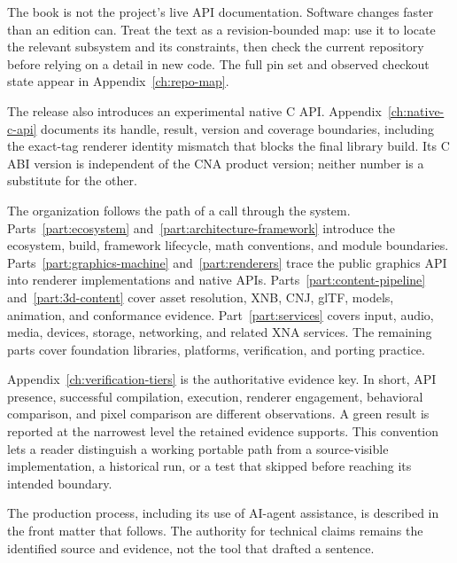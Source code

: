 The book is not the project's live API documentation. Software changes faster than an edition
can. Treat the text as a revision-bounded map: use it to locate the relevant subsystem and its
constraints, then check the current repository before relying on a detail in new code. The full
pin set and observed checkout state appear in Appendix~\ref{ch:repo-map}.

The release also introduces an experimental native C API. Appendix~\ref{ch:native-c-api}
documents its handle, result, version and coverage boundaries, including the exact-tag renderer
identity mismatch that blocks the final library build. Its C ABI version is independent of the
CNA product version; neither number is a substitute for the other.

The organization follows the path of a call through the system. Parts~\ref{part:ecosystem}
and~\ref{part:architecture-framework} introduce the ecosystem, build, framework lifecycle,
math conventions, and module boundaries. Parts~\ref{part:graphics-machine}
and~\ref{part:renderers} trace the public graphics API into renderer implementations and native
APIs. Parts~\ref{part:content-pipeline} and~\ref{part:3d-content} cover asset resolution, XNB,
CNJ, glTF, models, animation, and conformance evidence. Part~\ref{part:services} covers input,
audio, media, devices, storage, networking, and related XNA services. The remaining parts cover
foundation libraries, platforms, verification, and porting practice.

Appendix~\ref{ch:verification-tiers} is the authoritative evidence key. In short, API presence,
successful compilation, execution, renderer engagement, behavioral comparison, and pixel
comparison are different observations. A green result is reported at the narrowest level the
retained evidence supports. This convention lets a reader distinguish a working portable path
from a source-visible implementation, a historical run, or a test that skipped before reaching
its intended boundary.

The production process, including its use of AI-agent assistance, is described in the front
matter that follows. The authority for technical claims remains the identified source and
evidence, not the tool that drafted a sentence.
